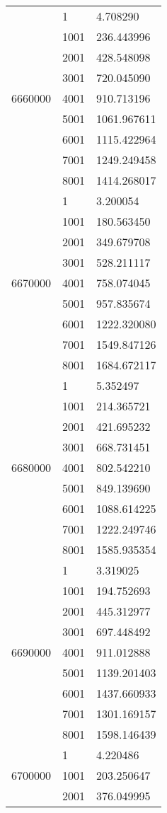 \begin{table}[htb!]
\begin{tabular}{lll}
\multirow[c]{9}{*}{6660000} & 1 & 4.708290 \\
 & 1001 & 236.443996 \\
 & 2001 & 428.548098 \\
 & 3001 & 720.045090 \\
 & 4001 & 910.713196 \\
 & 5001 & 1061.967611 \\
 & 6001 & 1115.422964 \\
 & 7001 & 1249.249458 \\
 & 8001 & 1414.268017 \\
\multirow[c]{9}{*}{6670000} & 1 & 3.200054 \\
 & 1001 & 180.563450 \\
 & 2001 & 349.679708 \\
 & 3001 & 528.211117 \\
 & 4001 & 758.074045 \\
 & 5001 & 957.835674 \\
 & 6001 & 1222.320080 \\
 & 7001 & 1549.847126 \\
 & 8001 & 1684.672117 \\
\multirow[c]{9}{*}{6680000} & 1 & 5.352497 \\
 & 1001 & 214.365721 \\
 & 2001 & 421.695232 \\
 & 3001 & 668.731451 \\
 & 4001 & 802.542210 \\
 & 5001 & 849.139690 \\
 & 6001 & 1088.614225 \\
 & 7001 & 1222.249746 \\
 & 8001 & 1585.935354 \\
\multirow[c]{9}{*}{6690000} & 1 & 3.319025 \\
 & 1001 & 194.752693 \\
 & 2001 & 445.312977 \\
 & 3001 & 697.448492 \\
 & 4001 & 911.012888 \\
 & 5001 & 1139.201403 \\
 & 6001 & 1437.660933 \\
 & 7001 & 1301.169157 \\
 & 8001 & 1598.146439 \\
\multirow[c]{9}{*}{6700000} & 1 & 4.220486 \\
 & 1001 & 203.250647 \\
 & 2001 & 376.049995 \\

\end{tabular}
\end{table}
